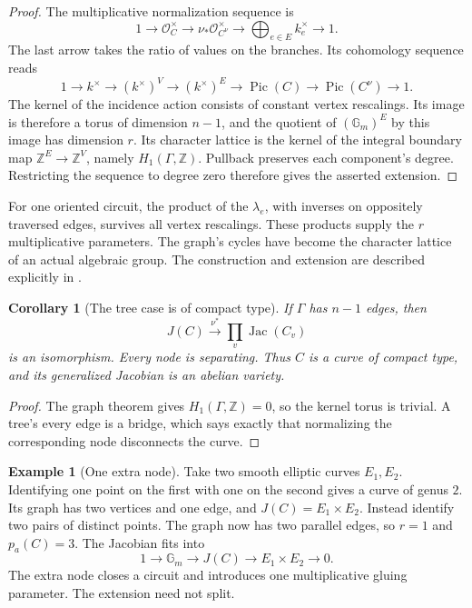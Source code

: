 \documentclass[11pt]{article}
\newtheorem{corollary}[theorem]{Corollary}
\theoremstyle{definition}
\newtheorem{example}[theorem]{Example}
\theoremstyle{remark}
\newcommand{\Z}{\mathbb Z}
\begin{document}
\begin{proof}
The multiplicative normalization sequence is
\[
  1\longrightarrow\mathcal O_C^\times\longrightarrow
  \nu_*\mathcal O_{C^\nu}^\times\longrightarrow
  \bigoplus_{e\in E}k_e^\times\longrightarrow1.
\]
The last arrow takes the ratio of values on the branches.  Its cohomology
sequence reads
\[
  1\longrightarrow k^\times\longrightarrow(k^\times)^V
   \longrightarrow(k^\times)^E\longrightarrow
   \operatorname{Pic}(C)\longrightarrow
   \operatorname{Pic}(C^\nu)\longrightarrow1.
\]
The kernel of the incidence action consists of constant vertex rescalings.
Its image is therefore a torus of dimension $n-1$, and the quotient of
$(\mathbb G_m)^E$ by this image has dimension $r$.  Its character lattice
is the kernel of the integral boundary map $\Z^E\to\Z^V$, namely
$H_1(\Gamma,\Z)$.  Pullback preserves each component's degree.  Restricting
the sequence to degree zero therefore gives the asserted extension.
\end{proof}

For one oriented circuit, the product of the $\lambda_e$, with inverses
on oppositely traversed edges, survives all vertex rescalings.  These
products supply the $r$ multiplicative parameters.  The graph's cycles
have become the character lattice of an actual algebraic group.
The construction and extension are described explicitly in
\cite[\S3.0--3.1]{CaporasoVivianiStableTorelli}.

\begin{corollary}[The tree case is of compact type]
If $\Gamma$ has $n-1$ edges, then
\[
  J(C)\xrightarrow{\ \nu^*\ }\prod_v\operatorname{Jac}(C_v)
\]
is an isomorphism.  Every node is separating.  Thus $C$ is a curve of
compact type, and its generalized Jacobian is an abelian variety.
\end{corollary}

\begin{proof}
The graph theorem gives $H_1(\Gamma,\Z)=0$, so the kernel torus is trivial.
A tree's every edge is a bridge, which says exactly that normalizing the
corresponding node disconnects the curve.
\end{proof}

\begin{example}[One extra node]
Take two smooth elliptic curves $E_1,E_2$.  Identifying one point on the
first with one on the second gives a curve of genus $2$.  Its graph has two
vertices and one edge, and $J(C)=E_1\times E_2$.
Instead identify two pairs of distinct points.  The graph now has two
parallel edges, so $r=1$ and $p_a(C)=3$.  The Jacobian fits into
\[
  1\longrightarrow\mathbb G_m\longrightarrow J(C)
   \longrightarrow E_1\times E_2\longrightarrow0.
\]
The extra node closes a circuit and introduces one multiplicative gluing
parameter.  The extension need not split.
\end{example}
\end{document}
